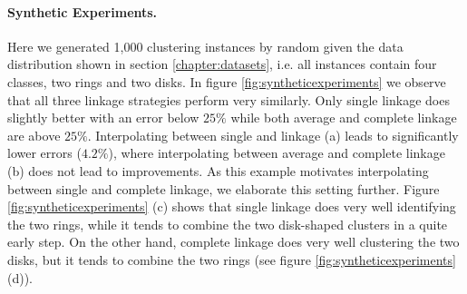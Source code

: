 \paragraph{Synthetic Experiments.} Here we generated 1,000 clustering instances by random given the data distribution shown in section \ref{chapter:datasets}, i.e. all instances contain four classes, two rings and two disks. In figure \ref{fig:syntheticexperiments} we observe that all three linkage strategies perform very similarly. Only single linkage does slightly better with an error below $25\%$ while both average and complete linkage are above $25\%$. Interpolating between single and linkage (a) leads to significantly lower errors ($4.2\%$), where interpolating between average and complete linkage (b) does not lead to improvements. As this example motivates interpolating between single and complete linkage, we elaborate this setting further. Figure \ref{fig:syntheticexperiments} (c) shows that single linkage does very well identifying the two rings, while it tends to combine the two disk-shaped clusters in a quite early step. On the other hand, complete linkage does very well clustering the two disks, but it tends to combine the two rings (see figure \ref{fig:syntheticexperiments} (d)).

